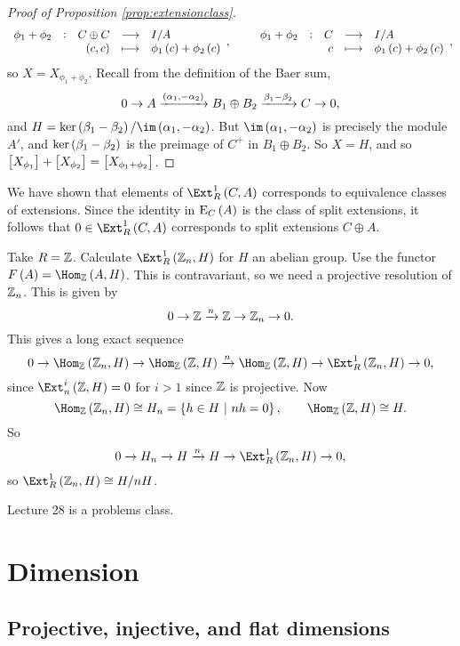 \begin{proof}[Proof of Proposition \ref{prop:extensionclass}]
$$ \function[\phi_1 + \phi_2]{C \oplus C}{I / A}{\br{c, c}}{\phi_1\br{c} + \phi_2\br{c}}, \qquad \function[\phi_1 + \phi_2]{C}{I / A}{c}{\phi_1\br{c} + \phi_2\br{c}}, $$
so $ X = X_{\phi_1 + \phi_2} $. Recall from the definition of the Baer sum,
$$ 0 \to A \xrightarrow{\br{\alpha_1, -\alpha_2}} B_1 \oplus B_2 \xrightarrow{\beta_1 - \beta_2} C \to 0, $$
and $ H = \ker \br{\beta_1 - \beta_2} / \im \br{\alpha_1, -\alpha_2} $. But $ \im \br{\alpha_1, -\alpha_2} $ is precisely the module $ A' $, and $ \ker \br{\beta_1 - \beta_2} $ is the preimage of $ C^+ $ in $ B_1 \oplus B_2 $. So $ X = H $, and so $ \sbr{X_{\phi_1}} + \sbr{X_{\phi_2}} = \sbr{X_{\phi_1 + \phi_2}} $.
\end{proof}

\pagebreak

We have shown that elements of $ \Ext_R^1\br{C, A} $ corresponds to equivalence classes of extensions. Since the identity in $ \E_C\br{A} $ is the class of split extensions, it follows that $ 0 \in \Ext_R^1\br{C, A} $ corresponds to split extensions $ C \oplus A $.

\begin{example*}
Take $ R = \mathbb{Z} $. Calculate $ \Ext_R^1\br{\ZZ_n, H} $ for $ H $ an abelian group. Use the functor $ F\br{A} = \Hom_\ZZ\br{A, H} $. This is contravariant, so we need a projective resolution of $ \mathbb{Z}_n $. This is given by
$$ 0 \to \mathbb{Z} \xrightarrow{n} \mathbb{Z} \to \mathbb{Z}_n \to 0. $$
This gives a long exact sequence
$$ 0 \to \Hom_\ZZ\br{\ZZ_n, H} \to \Hom_\ZZ\br{\ZZ, H} \xrightarrow{n} \Hom_\ZZ\br{\ZZ, H} \to \Ext_R^1\br{\ZZ_n, H} \to 0, $$
since $ \Ext_n^i\br{\ZZ, H} = 0 $ for $ i > 1 $ since $ \mathbb{Z} $ is projective. Now
$$ \Hom_\ZZ\br{\ZZ_n, H} \cong H_n = \cbr{h \in H \st nh = 0}, \qquad \Hom_\ZZ\br{\ZZ, H} \cong H. $$
So
$$ 0 \to H_n \to H \xrightarrow{n} H \to \Ext_R^1\br{\ZZ_n, H} \to 0, $$
so $ \Ext_R^1\br{\ZZ_n, H} \cong H / nH $.
\end{example*}


Lecture 28 is a problems class.

\pagebreak

\section{Dimension}

\subsection{Projective, injective, and flat dimensions}


